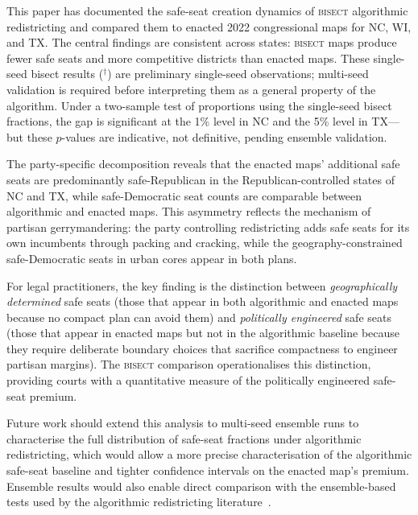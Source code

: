 \label{sec:conclusion}

This paper has documented the safe-seat creation dynamics of \textsc{bisect} algorithmic
redistricting and compared them to enacted 2022 congressional maps for NC, WI, and TX.
The central findings are consistent across states: \textsc{bisect} maps produce fewer
safe seats and more competitive districts than enacted maps. These single-seed bisect
results ($^\dagger$) are preliminary single-seed observations; multi-seed validation
is required before interpreting them as a general property of the algorithm. Under a
two-sample test of proportions using the single-seed bisect fractions, the gap is
significant at the 1\% level in NC and the 5\% level in TX---but these $p$-values are
indicative, not definitive, pending ensemble validation.

The party-specific decomposition reveals that the enacted maps' additional safe seats
are predominantly safe-Republican in the Republican-controlled states of NC and TX,
while safe-Democratic seat counts are comparable between algorithmic and enacted maps.
This asymmetry reflects the mechanism of partisan gerrymandering: the party controlling
redistricting adds safe seats for its own incumbents through packing and cracking,
while the geography-constrained safe-Democratic seats in urban cores appear in both
plans.

For legal practitioners, the key finding is the distinction between
\textit{geographically determined} safe seats (those that appear in both algorithmic
and enacted maps because no compact plan can avoid them) and \textit{politically
engineered} safe seats (those that appear in enacted maps but not in the algorithmic
baseline because they require deliberate boundary choices that sacrifice compactness
to engineer partisan margins). The \textsc{bisect} comparison operationalises this
distinction, providing courts with a quantitative measure of the politically engineered
safe-seat premium.

Future work should extend this analysis to multi-seed ensemble runs to characterise
the full distribution of safe-seat fractions under algorithmic redistricting, which
would allow a more precise characterisation of the algorithmic safe-seat baseline and
tighter confidence intervals on the enacted map's premium. Ensemble results would
also enable direct comparison with the ensemble-based tests used by the algorithmic
redistricting literature~\citep{herschlag2020quantifying}.
